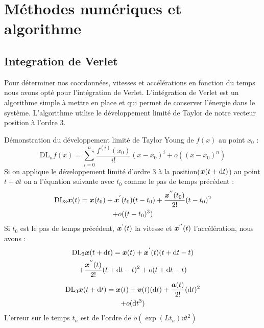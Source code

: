 \section{Méthodes numériques et algorithme}
    \subsection{Integration de Verlet}
        Pour déterminer nos coordonnées, vitesses et accélérations en fonction du temps nous avons opté pour l'intégration de Verlet. L'intégration de Verlet est un algorithme simple à mettre en place et qui permet de conserver l'énergie dans le système. L'algorithme utilise le développement limité de Taylor de notre vecteur position à l'ordre 3.

        Démonstration du développement limité de Taylor Young de $f(x)$ au point $x_0$\cite{agarwal_introduction_2011} :%
        \begin{equation}
            \mathrm{DL}_n f(x) = \sum_{i=0}^{n}\frac{f^{(i)}(x_0)}{i!}(x-x_0)^i+ o((x-x_0)^n)
        \end{equation}
        Si on applique le développement limité d'ordre 3 à la position($\vb*{x}(t+\mathrm{d}t)$) au point $t+\dd t$ on a l'équation suivante avec $t_0$ comme le pas de temps précédent :
        \begin{multline}
            \mathrm{DL}_3 \vb*{x}(t) = \vb*{x}(t_0)+\vb*{x}^{'}(t_0)(t-t_0)
            +\frac{\vb*{x}^{''}(t_0)}{2!}(t-t_0)^2 \\+o((t-t_0)^3)
        \end{multline}
        Si $t_0$ est le pas de temps précédent, $\vb*{x}^{'}(t)$ la vitesse et $\vb*{x}^{''}(t)$ l'accélération, nous avons :
        \begin{multline}
            \mathrm{DL}_3 \vb*{x}(t+\mathrm{d}t) = \vb*{x}(t)+\vb*{x}^{'}(t)(t+\mathrm{d}t-t)
            \\+\frac{\vb*{x}^{''}(t)}{2!}(t+\mathrm{d}t-t)^2+o(t+\mathrm{d}t-t)
        \end{multline}
        \begin{multline}
             \mathrm{DL}_3 \vb*{x}(t+\mathrm{d}t)= \vb*{x}(t)+\vb*{v}(t)(\mathrm{d}t)+\frac{\vb*{a}(t)}{2!}(\mathrm{d}t)^2
             \\+o(\mathrm{d}t^3)
        \end{multline}
        L'erreur sur le temps $t_n$ est de l'ordre de $o(\exp(Lt_n)\dd t^2)$ %

